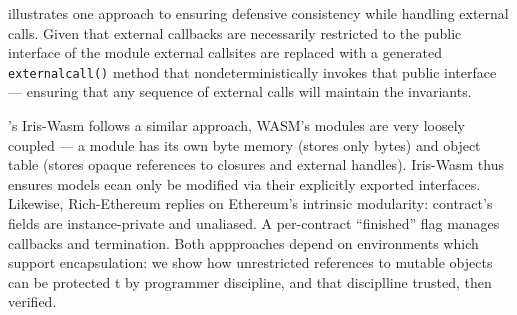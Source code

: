 \citet{CassezFQ24} illustrates one approach to ensuring defensive
consistency while handling external calls.
Given that 
external callbacks
are
necessarily restricted to the public interface of the module
external callsites are replaced 
with a
generated \texttt{externalcall()} method that 
nondeterministically invokes
%
that 
public
interface ---
ensuring that any 
sequence of external calls will maintain the
invariants.


\citet{iris-wasm-pldi2023}'s Iris-Wasm follows a similar approach,
WASM's
modules are very loosely coupled --- a module
has its own byte memory
(stores only bytes) 
and object table
(stores opaque references to closures and external handles).
%
%
Iris-Wasm thus ensures models 
ecan only be
modified via their explicitly exported interfaces.
%
Likewise, Rich-Ethereum \cite{rich-specs-smart-contracts-oopsla2021}
replies on Ethereum's intrinsic modularity:
contract's fields are instance-private
and unaliased.
A per-contract ``finished'' flag
manages callbacks and termination.
%
Both appproaches depend on
environments which support encapsulation:
we show how unrestricted references to mutable objects can be protected
t%
by programmer discipline,
and that disciplline trusted, then verified.







